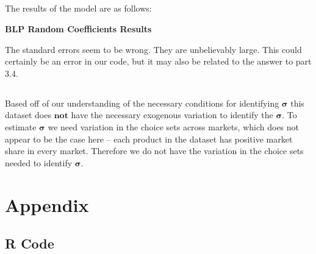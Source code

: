 \documentclass[11pt]{article}
\begin{document}
\subsection{}

The results of the model are as follows:

\begin{center}
	\centering
	\textbf{BLP Random Coefficients Results}\par\medskip
	\scalebox{1}{
		
	}
\end{center}

The standard errors seem to be wrong. They are unbelievably large. This could certainly be an error in our code, but it may also be related to the answer to part 3.4. 

\subsection{}
Based off of our understanding of the necessary conditions for identifying $\bm \sigma$ this dataset does $\textbf{not}$ have the necessary exogenous variation to identify the $\bm \sigma$. To estimate $\bm \sigma$ we need variation in the choice sets across markets, which does not appear to be the case here -- each product in the dataset has positive market share in every market. Therefore we do not have the variation in the choice sets needed to identify $\bm \sigma$.



\section{Appendix}
\subsection{R Code}






\end{document}
